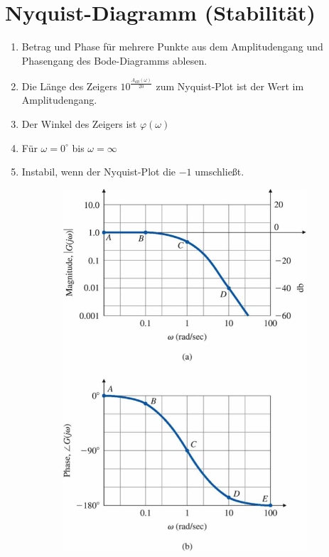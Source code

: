 \setcounter{section}{8}
\section{Nyquist-Diagramm (Stabilität)}
\begin{tcolorbox}[colback=white!10!white,
                  colframe=blue!50!white,
                  title=Konstruktionsregeln Nyquist-Diagramm]
    \begin{enumerate}
    \item Betrag und Phase für mehrere Punkte aus dem Amplitudengang und 
        Phasengang des Bode-Diagramms ablesen. 
    \item Die Länge des Zeigers $10^{\frac{A_{dB}(\omega)}{20}}$ zum Nyquist-Plot ist der 
        Wert im Amplitudengang.
    \item Der Winkel des Zeigers ist $\varphi(\omega)$
    \item Für $\omega = 0^{\circ}$ bis $\omega = \infty$
    \item Instabil, wenn der Nyquist-Plot die $-1$ umschließt.
\end{enumerate}
\begin{figure}[H]
    \begin{subfigure}{0.5\linewidth}
        \includegraphics[width=\linewidth]{images/nyquist2}

\end{subfigure}
\end{figure}
\end{tcolorbox}
